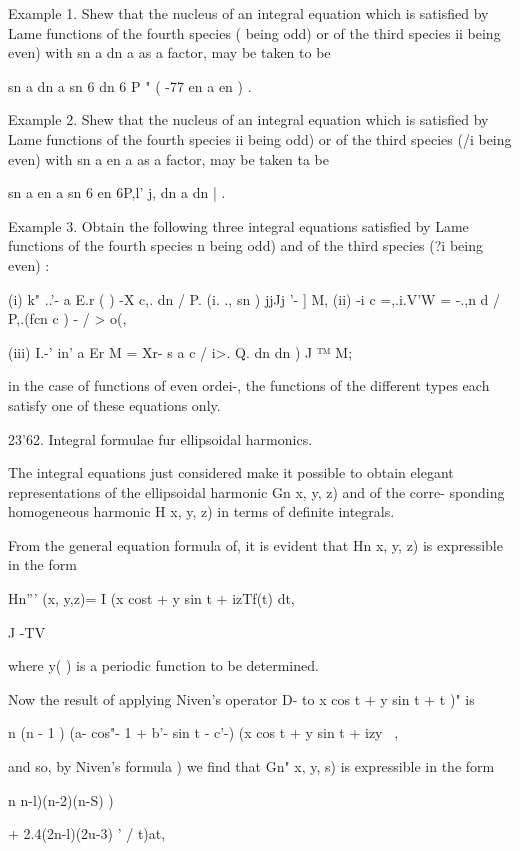 {{{{{{{{Example 1. Shew that the nucleus of an integral equation which is
satisfied by Lame functions of the fourth species ( being odd) or of
the third species ii being even) with sn a dn a as a factor, may be
taken to be

sn a dn a sn 6 dn 6 P " ( -77 en a en ) .

Example 2. Shew that the nucleus of an integral equation which is
satisfied by Lame functions of the fourth species ii being odd) or of
the third species (/i being even) with sn a en a as a factor, may be
taken ta be

sn a en a sn 6 en 6P,l' j, dn a dn | .

Example 3. Obtain the following three integral equations satisfied by
Lame functions of the fourth species n being odd) and of the third
species (?i being even) :

(i) k" ..'- a E.r ( ) -X c,. dn / P. (i. ., sn ) jjJj '- ] M, (ii) -i
c =,.i.V'W = -.,n d / P,.(fcn c ) - / > o(,

(iii) I.-' in' a Er M = Xr- s a c / i>. Q. dn dn ) J ™ M;

in the case of functions of even ordei-, the functions of the
different types each satisfy one of these equations only.

23'62. Integral formulae fur ellipsoidal harmonics.

The integral equations just considered make it possible to obtain
elegant representations of the ellipsoidal harmonic Gn x, y, z) and of
the corre- sponding homogeneous harmonic H x, y, z) in terms of
definite integrals.

From the general equation formula of, it is evident that Hn x,
y, z) is expressible in the form

Hn''' (x, y,z)= I (x cost + y sin t + izTf(t) dt,

J -TV

where y( ) is a periodic function to be determined.

Now the result of applying Niven's operator D- to x cos t + y sin t +
t )" is

n (n - 1 ) (a- cos"- 1 + b'- sin t - c'-) (x cos t + y sin t + izy ~,

and so, by Niven's formula ) we find that Gn" x, y, s) is
expressible in the form

n n-l)(n-2)(n-S) )

+ 2.4(2n-l)(2u-3) '  / t)at,

%
%

}}}}}}}}
